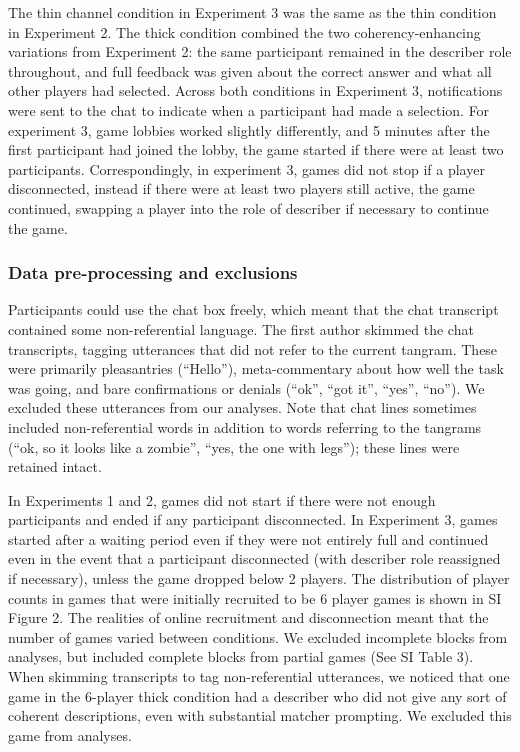 \documentclass[
  english,
]{article}
\begin{document}
The thin channel condition in Experiment 3 was the same as the thin condition in Experiment 2.
The thick condition combined the two coherency-enhancing variations from Experiment 2: the same participant remained in the describer role throughout, and full feedback was given about the correct answer and what all other players had selected.
Across both conditions in Experiment 3, notifications were sent to the chat to indicate when a participant had made a selection.
For experiment 3, game lobbies worked slightly differently, and 5 minutes after the first participant had joined the lobby, the game started if there were at least two participants. Correspondingly, in experiment 3, games did not stop if a player disconnected, instead if there were at least two players still active, the game continued, swapping a player into the role of describer if necessary to continue the game.

\hypertarget{data-pre-processing-and-exclusions}{%
\subsubsection{Data pre-processing and exclusions}\label{data-pre-processing-and-exclusions}}

Participants could use the chat box freely, which meant that the chat transcript contained some non-referential language. The first author skimmed the chat transcripts, tagging utterances that did not refer to the current tangram. These were primarily pleasantries (``Hello''), meta-commentary about how well the task was going, and bare confirmations or denials (``ok'', ``got it'', ``yes'', ``no''). We excluded these utterances from our analyses. Note that chat lines sometimes included non-referential words in addition to words referring to the tangrams (``ok, so it looks like a zombie'', ``yes, the one with legs''); these lines were retained intact.

In Experiments 1 and 2, games did not start if there were not enough participants and ended if any participant disconnected.
In Experiment 3, games started after a waiting period even if they were not entirely full and continued even in the event that a participant disconnected (with describer role reassigned if necessary), unless the game dropped below 2 players.
The distribution of player counts in games that were initially recruited to be 6 player games is shown in SI Figure 2.
The realities of online recruitment and disconnection meant that the number of games varied between conditions.
We excluded incomplete blocks from analyses, but included complete blocks from partial games (See SI Table 3).
When skimming transcripts to tag non-referential utterances, we noticed that one game in the 6-player thick condition had a describer who did not give any sort of coherent descriptions, even with substantial matcher prompting. We excluded this game from analyses.
\end{document}
